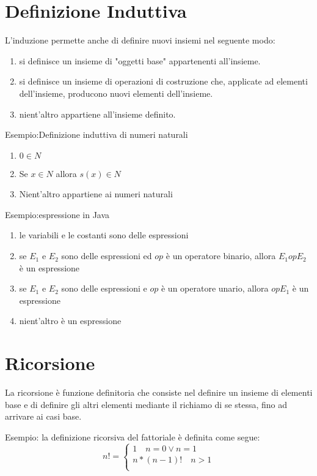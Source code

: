 \section{Definizione Induttiva}
L'induzione permette anche di definire nuovi insiemi nel seguente modo:
\begin{enumerate}
  \item si definisce un insieme di "oggetti base" appartenenti all'insieme.
  \item si definisce un insieme di operazioni di costruzione che, applicate ad elementi
        dell'insieme, producono nuovi elementi dell'insieme.
  \item nient'altro appartiene all'insieme definito.
\end{enumerate}

Esempio:Definizione induttiva di numeri naturali\newline
\begin{enumerate}
  \item $0 \in N$
  \item Se $x \in N$ allora $s(x) \in N$
  \item Nient'altro appartiene ai numeri naturali
\end{enumerate}

Esempio:espressione in Java
\begin{enumerate}
    \item le variabili e le costanti sono delle espressioni
    \item se $E_1$ e $E_2$ sono delle espressioni ed $op$ è un operatore binario,
          allora $E_1 op E_2$ è un espressione
    \item se $E_1$ e $E_2$ sono delle espressioni e $op$ è un operatore unario,
          allora $op E_1$ è un espressione
    \item nient'altro è un espressione
\end{enumerate}

\section{Ricorsione}
La ricorsione è funzione definitoria che consiste nel definire un insieme
di elementi base e di definire gli altri elementi mediante il richiamo di se stessa,
fino ad arrivare ai casi base.

Esempio:
la definizione ricorsiva del fattoriale è definita come segue:
\begin{equation*}
    n! = \begin{cases} 1 \quad n = 0 \lor n = 1 \\ n * (n-1)! \quad n > 1\\
\end{cases}
\end{equation*}

